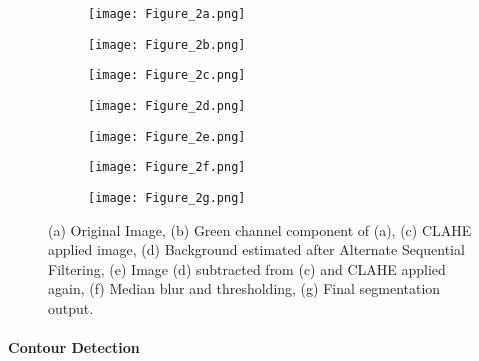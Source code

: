 \documentclass{svproc}
\begin{document}
\vspace{-3mm}
\begin{figure}
     \centering
     \begin{subfigure}[b]{0.24\textwidth}
         \centering
         \texttt{[image: Figure\_2a.png]}
         \caption{}
         \label{fig: fig2a}
     \end{subfigure}
     \begin{subfigure}[b]{0.24\textwidth}
         \centering
         \texttt{[image: Figure\_2b.png]}
         \caption{}
         \label{fig: fig2b}
     \end{subfigure}
     \begin{subfigure}[b]{0.24\textwidth}
         \centering
         \texttt{[image: Figure\_2c.png]}
         \caption{}
         \label{fig: fig2c}
     \end{subfigure}
     \begin{subfigure}[b]{0.24\textwidth}
         \centering
         \texttt{[image: Figure\_2d.png]}
         \caption{}
         \label{fig: fig2d}
     \end{subfigure}
     \begin{subfigure}[b]{0.24\textwidth}
         \centering
         \texttt{[image: Figure\_2e.png]}
         \caption{}
         \label{fig: fig2e}
     \end{subfigure}
     \begin{subfigure}[b]{0.24\textwidth}
         \centering
         \texttt{[image: Figure\_2f.png]}
         \caption{}
         \label{fig: fig2f}
     \end{subfigure}
     \begin{subfigure}[b]{0.24\textwidth}
         \centering
         \texttt{[image: Figure\_2g.png]}
         \caption{}
         \label{fig: fig2g}
     \end{subfigure}
     \vspace{-1mm}
     \caption{(a) Original Image, (b) Green channel component of (a), (c) CLAHE applied image, (d) Background estimated after Alternate Sequential Filtering, (e) Image (d) subtracted from (c) and CLAHE applied again, (f) Median blur and thresholding, (g) Final segmentation output.}
     \label{fig: fig2}
\end{figure}

\vspace{-10mm}
\paragraph{Contour Detection}
\end{document}
